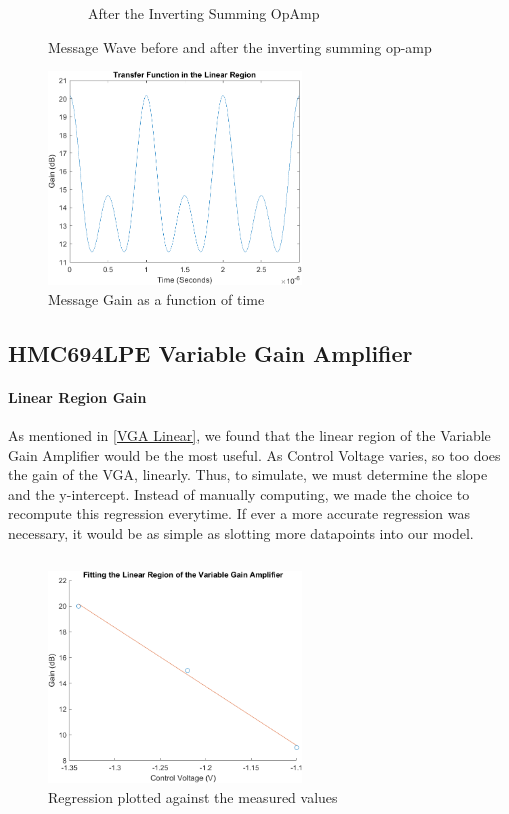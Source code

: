 \begin{figure}[H]
\begin{subfigure}[b]{0.48\textwidth}
        \caption{After the Inverting Summing OpAmp}
        \label{fig:opAmpVTime}
     \end{subfigure}
        \caption{Message Wave before and after the inverting summing op-amp}
        \label{fig:Both Graphs}
\end{figure}

\begin{figure}[H]
    \centering
    \includegraphics[width = 0.6\textwidth]{Images/Message Gain.png}
    \caption{Message Gain as a function of time}
    \label{fig:Gain}
\end{figure}

\subsection{HMC694LPE Variable Gain Amplifier}
    \paragraph{Linear Region Gain}
    As mentioned in \ref{VGA Linear}, we found that the linear region of the Variable Gain Amplifier would be the most useful. As Control Voltage varies, so too does the gain of the VGA, linearly. Thus, to simulate, we must determine the slope and the y-intercept. Instead of manually computing, we made the choice to recompute this regression everytime. If ever a more accurate regression was necessary, it would be as simple as slotting more datapoints into our model.
    
    \inputminted[breaklines]{Matlab}{./Code/VGASim.m}
    
    \begin{figure}[H]
        \centering
        \includegraphics[width = 0.6\textwidth]{Images/LinearRegression.png}
        \caption{Regression plotted against the measured values}
        \label{fig:regression}
    \end{figure}

